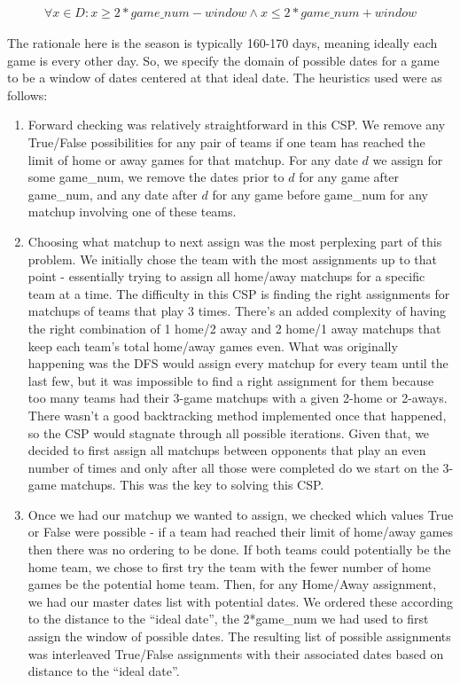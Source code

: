 \documentclass{article}
\begin{document}
	\begin{eqnarray*}
		\forall x \in D: x \geq 2*game\_num - window \land x \leq 2*game\_num + window
	\end{eqnarray*}

	The rationale here is the season is typically 160-170 days, meaning ideally each game is every other day. So, we specify the domain of possible dates for a game to be a window of dates centered at that ideal date. The heuristics used were as follows:
	\begin{enumerate}
		\item Forward checking was relatively straightforward in this CSP. We remove any True/False possibilities for any pair of teams if one team has reached the limit of home or away games for that matchup. For any date $d$ we assign for some game\_num, we remove the dates prior to $d$ for any game after game\_num, and any date after $d$ for any game before game\_num for any matchup involving one of these teams.
		\item Choosing what matchup to next assign was the most perplexing part of this problem. We initially chose the team with the most assignments up to that point - essentially trying to assign all home/away matchups for a specific team at a time. The difficulty in this CSP is finding the right assignments for matchups of teams that play 3 times. There's an added complexity of having the right combination of 1 home/2 away and 2 home/1 away matchups that keep each team's total home/away games even. What was originally happening was the DFS would assign every matchup for every team until the last few, but it was impossible to find a right assignment for them because too many teams had their 3-game matchups with a given 2-home or 2-aways. There wasn't a good backtracking method implemented once that happened, so the CSP would stagnate through all possible iterations. Given that, we decided to first assign all matchups between opponents that play an even number of times and only after all those were completed do we start on the 3-game matchups. This was the key to solving this CSP.
		\item Once we had our matchup we wanted to assign, we checked which values True or False were possible - if a team had reached their limit of home/away games then there was no ordering to be done. If both teams could potentially be the home team, we chose to first try the team with the fewer number of home games be the potential home team. Then, for any Home/Away assignment, we had our master dates list with potential dates. We ordered these according to the distance to the ``ideal date'', the 2*game\_num we had used to first assign the window of possible dates. The resulting list of possible assignments was interleaved True/False assignments with their associated dates based on distance to the ``ideal date''.

\end{enumerate}
\end{document}
